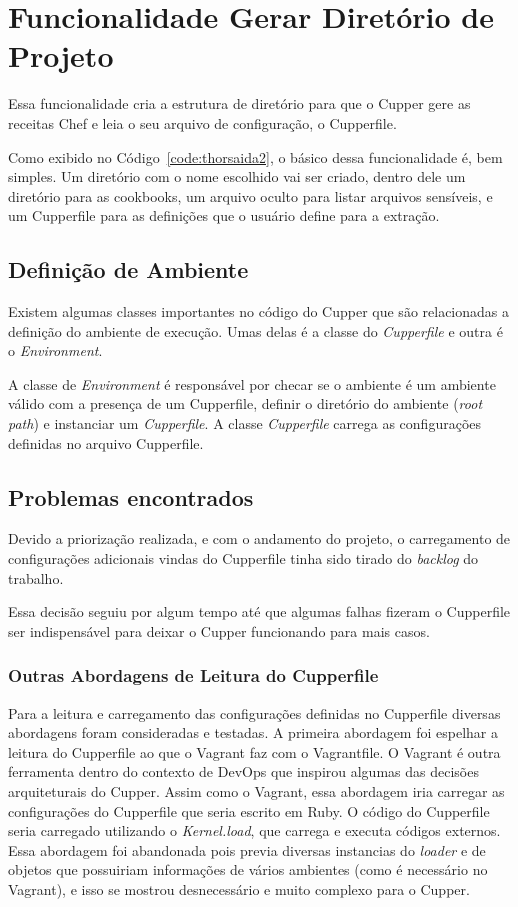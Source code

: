 \section{Funcionalidade Gerar Diretório de Projeto}
\label{sec:proj}

Essa funcionalidade cria a estrutura de diretório para que o Cupper gere as 
receitas Chef e leia o seu arquivo de configuração, o Cupperfile.

Como exibido no Código~\ref{code:thorsaida2}, o básico dessa funcionalidade é, bem
simples. Um diretório com o nome escolhido vai ser criado, dentro dele um diretório
para as cookbooks, um arquivo oculto para listar arquivos sensíveis, e um 
Cupperfile para as definições que o usuário define para a extração.

\subsection{Definição de Ambiente}
Existem algumas classes importantes no código do Cupper que são relacionadas a
definição do ambiente de execução. Umas delas é a classe do \textit{Cupperfile} e outra
é o \textit{Environment}.

A classe de \textit{Environment} é responsável por checar se o ambiente é um
ambiente válido com a presença de um Cupperfile, definir o diretório do ambiente
(\textit{root\underline{ }path}) e instanciar um \textit{Cupperfile}. A classe \textit{Cupperfile} carrega as configurações definidas no arquivo Cupperfile.

\subsection{Problemas encontrados}
Devido a priorização realizada, e com o andamento do projeto, o carregamento de
configurações adicionais vindas do Cupperfile tinha sido tirado do \textit{backlog} do
trabalho.

Essa decisão seguiu por algum tempo até que algumas falhas fizeram o Cupperfile
ser indispensável para deixar o Cupper funcionando para mais casos.

\subsubsection{Outras Abordagens de Leitura do Cupperfile}
Para a leitura e carregamento das configurações definidas no Cupperfile diversas
abordagens foram consideradas e testadas. A primeira abordagem foi espelhar a
leitura do Cupperfile ao que o Vagrant faz com o Vagrantfile. O Vagrant é outra
ferramenta dentro do contexto de DevOps que inspirou algumas das decisões arquiteturais
do Cupper. Assim como o Vagrant, essa abordagem iria carregar as configurações
do Cupperfile que seria escrito em Ruby. O código do Cupperfile seria carregado
utilizando o \textit{Kernel.load}, que carrega e executa códigos externos.
Essa abordagem foi abandonada pois previa diversas instancias do \textit{loader}
e de objetos que possuiriam informações de vários ambientes (como é necessário
no Vagrant), e isso se mostrou desnecessário e muito complexo para o Cupper.

